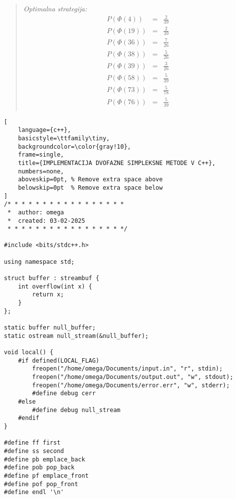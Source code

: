 \documentclass{article}
\begin{document}
\begin{enumerate}[label=\alph*)]
\begin{center}
\begin{minipage}[t][4.5cm][t]{0.45\textwidth}
\begin{quote}
    \textit{Optimalna strategija:}
    \begingroup
    \setlength{\tabcolsep}{10pt} %
    \renewcommand{\arraystretch}{1.5} %
    $$
    \begin{array}{lcc}
    P(\Phi(4))  & = & \frac{2}{39} \\
    P(\Phi(19)) & = & \frac{2}{39} \\
    P(\Phi(36)) & = & \frac{7}{26} \\
    P(\Phi(38)) & = & \frac{5}{26} \\
    P(\Phi(39)) & = & \frac{3}{26} \\
    P(\Phi(58)) & = & \frac{5}{39} \\
    P(\Phi(73)) & = & \frac{5}{78} \\
    P(\Phi(76)) & = & \frac{5}{39} \\
    \end{array}
    $$
    \endgroup
\end{quote}

\end{minipage}
\end{center}

\clearpage

\begin{lstlisting}[
    language={c++}, 
    basicstyle=\ttfamily\tiny, 
    backgroundcolor=\color{gray!10}, 
    frame=single, 
    title={IMPLEMENTACIJA DVOFAZNE SIMPLEKSNE METODE V C++},
    numbers=none,
    aboveskip=0pt, % Remove extra space above
    belowskip=0pt  % Remove extra space below
]
/* * * * * * * * * * * * * * * * *
 *	author: omega
 *	created: 03-02-2025
 * * * * * * * * * * * * * * * * */

#include <bits/stdc++.h>

using namespace std;

struct buffer : streambuf {
    int overflow(int x) {
        return x;
    }
};

static buffer null_buffer;
static ostream null_stream(&null_buffer);

void local() {
    #if defined(LOCAL_FLAG)
        freopen("/home/omega/Documents/input.in", "r", stdin);
        freopen("/home/omega/Documents/output.out", "w", stdout);
        freopen("/home/omega/Documents/error.err", "w", stderr);
        #define debug cerr
    #else
        #define debug null_stream
    #endif
}

#define ff first
#define ss second
#define pb emplace_back
#define pob pop_back
#define pf emplace_front
#define pof pop_front
#define endl '\n'


\end{lstlisting}
\end{enumerate}
\end{document}
